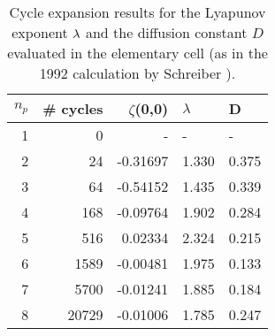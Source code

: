 
\begin{table}[htbp]
	\centering
	\begin{tabular}{|r|r|r|l|l|}
		\hline
		${n_p}$ & \# cycles & $\zeta$(0,0) & $\lambda$ & D \\
		\hline\hline
		1      & 0      &   -    &   -  &   - \\
		2      & 24     & -0.31697 & 1.330 & 0.375\\
		3      & 64     & -0.54152 & 1.435 & 0.339\\
		4      & 168    & -0.09764 & 1.902 & 0.284\\
		5      & 516    &  0.02334 & 2.324 & 0.215\\
		6      & 1589   & -0.00481 & 1.975 & 0.133\\
		7      & 5700   & -0.01241 & 1.885 & 0.184\\
		8      & 20729  & -0.01006 & 1.785 & 0.247\\ \hline
	\end{tabular}
	\caption[Elementary cell cycle expansion results of diffusion coefficient]
        {\label{TCELL1}
        Cycle expansion  results for the Lyapunov
        exponent $\lambda$ and the diffusion constant $D$ evaluated in the 		
        elementary cell (as in the 1992 calculation by Schreiber
        \etal{}).
        }
\end{table}



